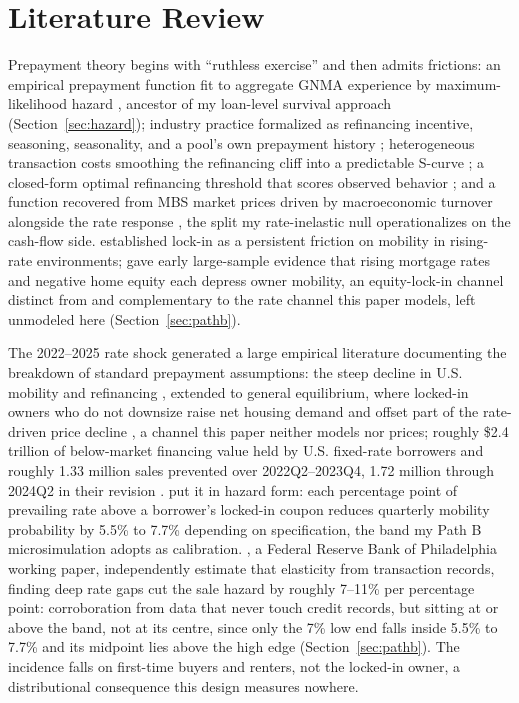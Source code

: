 \section{Literature Review}\label{sec:lit}

Prepayment theory begins with ``ruthless exercise'' \citep{dunn1981} and then admits frictions: an empirical prepayment function fit to aggregate GNMA experience by maximum-likelihood hazard \citep{schwartz1989}, ancestor of my loan-level survival approach (Section~\ref{sec:hazard}); industry practice formalized as refinancing incentive, seasoning, seasonality, and a pool's own prepayment history \citep{richard1989}; heterogeneous transaction costs smoothing the refinancing cliff into a predictable S-curve \citep{stanton1995}; a closed-form optimal refinancing threshold that scores observed behavior \citep{agarwal2013}; and a function recovered from MBS market prices driven by macroeconomic turnover alongside the rate response \citep{chernov2018}, the split my rate-inelastic null operationalizes on the cash-flow side. \citet{quigley1987,quigley2002} established lock-in as a persistent friction on mobility in rising-rate environments; \citet{ferreira2010} gave early large-sample evidence that rising mortgage rates and negative home equity each depress owner mobility, an equity-lock-in channel distinct from and complementary to the rate channel this paper models, left unmodeled here (Section~\ref{sec:pathb}).

The 2022--2025 rate shock generated a large empirical literature documenting the breakdown of standard prepayment assumptions: the steep decline in U.S. mobility and refinancing \citep{fonseca2024}, extended to general equilibrium, where locked-in owners who do not downsize raise net housing demand and offset part of the rate-driven price decline \citep{fonseca2026}, a channel this paper neither models nor prices; roughly \$2.4 trillion of below-market financing value held by U.S. fixed-rate borrowers and roughly 1.33 million sales prevented over 2022Q2--2023Q4, 1.72 million through 2024Q2 in their revision \citep{batzer2024}. \citet{liebersohn2024} put it in hazard form: each percentage point of prevailing rate above a borrower's locked-in coupon reduces quarterly mobility probability by 5.5\% to 7.7\% depending on specification, the band my Path B microsimulation adopts as calibration. \citet{graybill2026}, a Federal Reserve Bank of Philadelphia working paper, independently estimate that elasticity from transaction records, finding deep rate gaps cut the sale hazard by roughly 7--11\% per percentage point: corroboration from data that never touch credit records, but sitting at or above the band, not at its centre, since only the 7\% low end falls inside 5.5\% to 7.7\% and its midpoint lies above the high edge (Section~\ref{sec:pathb}). The incidence falls on first-time buyers and renters, not the locked-in owner, a distributional consequence this design measures nowhere.

